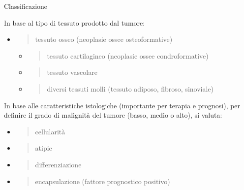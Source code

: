 \documentclass[]{article}
\begin{document}
Classificazione

In base al tipo di tessuto prodotto dal tumore:

\begin{itemize}
\item
  \begin{quote}
  tessuto osseo (neoplasie ossee osteoformative)
  \end{quote}

  \begin{itemize}
  \item
    \begin{quote}
    tessuto cartilagineo (neoplasie ossee condroformative)
    \end{quote}
  \item
    \begin{quote}
    tessuto vascolare
    \end{quote}
  \item
    \begin{quote}
    diversi tessuti molli (tessuto adiposo, fibroso, sinoviale)
    \end{quote}
  \end{itemize}
\end{itemize}

In base alle caratteristiche istologiche (importante per terapia e
prognosi), per definire il grado di malignità del tumore (basso, medio o
alto), si valuta:

\begin{itemize}
\item
  \begin{quote}
  cellularità
  \end{quote}
\end{itemize}

\begin{itemize}
\item
  \begin{quote}
  atipie
  \end{quote}
\end{itemize}

\begin{itemize}
\item
  \begin{quote}
  differenziazione
  \end{quote}
\item
  \begin{quote}
  encapsulazione (fattore prognostico positivo)
  \end{quote}
\end{itemize}
\end{document}
